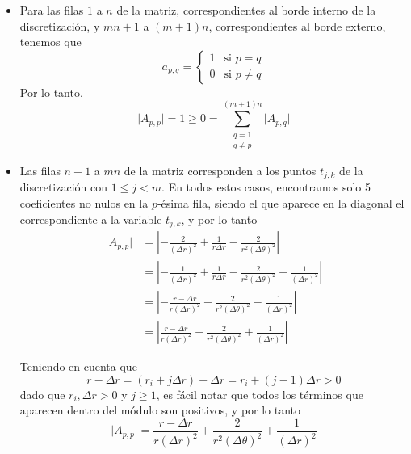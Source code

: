             \begin{itemize}
                \item Para las filas $1$ a $n$ de la matriz, correspondientes al borde interno de la discretización, y $mn + 1 $ a $(m+1)n$, correspondientes al borde externo, tenemos que
                    \[ a_{p,q} = \begin{cases}
                        1 & \text{si $p = q$} \\
                        0 & \text{si $p \neq q$}
                    \end{cases} \]
                Por lo tanto,
                    \[ \vert A_{p,p} \vert = 1 \geq 0 = \sum_{\substack{q=1 \\ q \neq p}}^{(m+1)n} \vert A_{p,q} \vert \]

                \item Las filas $n + 1$ a $mn$ de la matriz corresponden a los puntos $t_{j,k}$ de la discretización con $1 \leq j < m$. En todos estos casos, encontramos solo 5 coeficientes no nulos en la $p$-ésima fila, siendo el que aparece en la diagonal el correspondiente a la variable $t_{j,k}$, y por lo tanto
                    \[ \begin{split}
                        \vert A_{p,p} \vert &= \left \vert - \frac{2}{(\Delta r)^2} + \frac{1}{r \Delta r} - \frac{2}{r^2 (\Delta \theta)^2} \right \vert \\
                        &= \left \vert - \frac{1}{(\Delta r)^2} + \frac{1}{r \Delta r} - \frac{2}{r^2 (\Delta \theta)^2} - \frac{1}{(\Delta r)^2} \right \vert \\
                        &= \left \vert - \frac{r - \Delta r}{r (\Delta r)^2} - \frac{2}{r^2 (\Delta \theta)^2} - \frac{1}{(\Delta r)^2} \right \vert \\
                        &= \left \vert \frac{r - \Delta r}{r (\Delta r)^2} + \frac{2}{r^2 (\Delta \theta)^2} + \frac{1}{(\Delta r)^2} \right \vert
                    \end{split} \]

                Teniendo en cuenta que
                    \[ r - \Delta r = (r_i + j \Delta r) - \Delta r = r_i + (j - 1) \Delta r > 0\]
                dado que $r_i, \Delta r > 0$ y $j \geq 1$, es fácil notar que todos los términos que aparecen dentro del módulo son positivos, y por lo tanto
                    \[ \vert A_{p,p} \vert = \frac{r - \Delta r}{r (\Delta r)^2} + \frac{2}{r^2 (\Delta \theta)^2} + \frac{1}{(\Delta r)^2} \]


\end{itemize}
